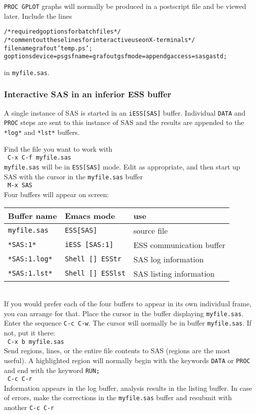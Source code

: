 \documentclass{article}
\newcommand{\stexttt}[1]{{\small\texttt{#1}}}
\newcommand{\elcode}[1]{\\{\stexttt{\hspace*{2em} #1}}\\}
\newenvironment{Salltt}{\small\begin{alltt}}{\end{alltt}}
\begin{document}
\stexttt{PROC GPLOT} graphs will normally be produced in a postscript
file and be viewed later.  Include the lines
\begin{Salltt}
    /* required goptions for batch files */
    /* comment out these lines for interactive use on X-terminals*/
    filename grafout 'temp.ps';
    goptions device=ps gsfname=grafout gsfmode=append gaccess=sasgastd;
\end{Salltt}
\noindent
in \stexttt{myfile.sas}.


\subsubsection{Interactive SAS in an inferior ESS buffer}
A single instance of SAS is started in an \stexttt{iESS[SAS]} buffer.
Individual \stexttt{DATA} and \stexttt{PROC} steps are sent to this
instance of SAS and the results are appended to the \stexttt{*log*}
and \stexttt{*lst*} buffers.

Find the file you want to work with
    \elcode{C-x C-f myfile.sas}
\stexttt{myfile.sas} will be in \stexttt{ESS[SAS]} mode.
Edit as appropriate, and then start up SAS with the cursor in
the \stexttt{myfile.sas} buffer
    \elcode{M-x SAS}
Four buffers will appear on screen:\\
\begin{tabular}{lll}  \hline
  Buffer name     & Emacs mode         & use\\  \hline
  \stexttt{myfile.sas}  & \stexttt{ESS[SAS]}       &source file   \\
  \stexttt{*SAS:1*}     & \stexttt{iESS [SAS:1]}   &ESS communication buffer \\
  \stexttt{*SAS:1.log*} & \stexttt{Shell [] ESStr} &SAS log information      \\
  \stexttt{*SAS:1.lst*} & \stexttt{Shell [] ESSlst}&SAS listing information  \\
  \hline
\end{tabular}\\[1ex]
If you would prefer each of the four buffers to appear in its own
individual frame, you can arrange for that.  Place the cursor in the
buffer displaying \stexttt{myfile.sas}.  Enter the sequence \stexttt{C-c C-w}.
The cursor will normally be in buffer \stexttt{myfile.sas}.  If
not, put it there:
    \elcode{C-x b myfile.sas}
Send regions, lines, or the entire file contents to SAS
(regions are the most useful).  A highlighted region will normally
begin with the keywords \stexttt{DATA} or \stexttt{PROC} and end with the
keyword \stexttt{RUN;}
    \elcode{C-c C-r}
Information appears in the log buffer, analysis results in the
listing buffer.  In case of errors, make the corrections in the
\stexttt{myfile.sas} buffer and resubmit with another \stexttt{C-c C-r}
\end{document}
